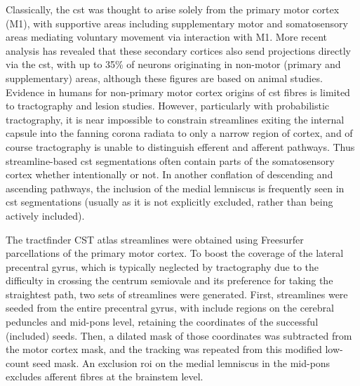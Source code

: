 
Classically, the \gls{cst} was thought to arise solely from the primary motor cortex (M1), with supportive areas including supplementary motor and somatosensory areas mediating voluntary movement via interaction with M1.
More recent analysis has revealed that these secondary cortices also send projections directly via the \gls{cst},\autocite{Kandel2021} with up to 35\% of neurons originating in non-motor (primary and supplementary) areas, although these figures are based on animal studies.\autocite{Welniarz2017}
Evidence in humans for non-primary motor cortex origins of \gls{cst} fibres is limited to tractography and lesion studies.\autocite{Kumar2009,Jane1967}
However, particularly with probabilistic tractography, it is near impossible to constrain streamlines exiting the internal capsule into the fanning corona radiata to only a narrow region of cortex, and of course tractography is unable to distinguish efferent and afferent pathways.
Thus streamline-based \gls{cst} segmentations often contain parts of the somatosensory cortex whether intentionally or not.\autocite{Poulin2021}
In another conflation of descending and ascending pathways, the inclusion of the medial lemniscus is frequently seen in \gls{cst} segmentations (usually as it is not explicitly excluded, rather than being actively included).\autocite{Wasserthal2018,Warrington2020,Poulin2021}

The tractfinder CST atlas streamlines were obtained using Freesurfer parcellations \autocite{Desikan2006,FischlSalat2002} of the primary motor cortex.
To boost the coverage of the lateral precentral gyrus,\autocite{Ebeling1992} which is typically neglected by tractography due to the difficulty in crossing the centrum semiovale and its preference for taking the straightest path, two sets of streamlines were generated.
First, streamlines were seeded from the entire precentral gyrus, with include regions on the cerebral peduncles and mid-pons level, retaining the coordinates of the successful (included) seeds.
Then, a dilated mask of those coordinates was subtracted from the motor cortex mask, and the tracking was repeated from this modified low-count seed mask.
An exclusion \gls{roi} on the medial lemniscus in the mid-pons excludes afferent fibres at the brainstem level.


